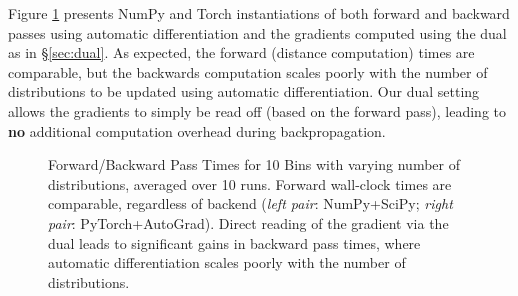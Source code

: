 Figure \ref{fig:speeds} presents NumPy and Torch instantiations of both forward and backward passes using automatic differentiation and the gradients computed using the dual as in \S\ref{sec:dual}. As expected, the forward (distance computation) times are comparable, but the backwards computation scales poorly with the number of distributions to be updated using automatic differentiation. Our dual setting allows the gradients to simply be read off (based on the forward pass), leading to \textbf{no} additional computation overhead during backpropagation.
\begin{figure}[ht]
    \centering
    \;
    \caption{\footnotesize Forward/Backward Pass Times for 10 Bins with varying number of distributions, averaged over 10 runs. Forward wall-clock times are comparable, regardless of backend ({\em left pair}: NumPy+SciPy; {\em right pair}: PyTorch+AutoGrad). Direct reading of the gradient via the dual leads to significant gains in backward pass times, where automatic differentiation scales poorly with the number of distributions.}
    \label{fig:speeds}
    \vspace{-5pt}
\end{figure}


